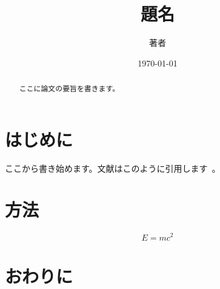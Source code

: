 \documentclass[uplatex,dvipdfmx,a4paper,11pt]{jsarticle}
\title{題名}
\author{著者}
\date{\today}
\begin{document}
\maketitle

\begin{abstract}
  ここに論文の要旨を書きます。
\end{abstract}

\section{はじめに}

ここから書き始めます。文献はこのように引用します~\cite{okumura2023}。

\section{方法}

\begin{equation}
  E = mc^2
  \label{eq:energy}
\end{equation}

\section{おわりに}



\end{document}
